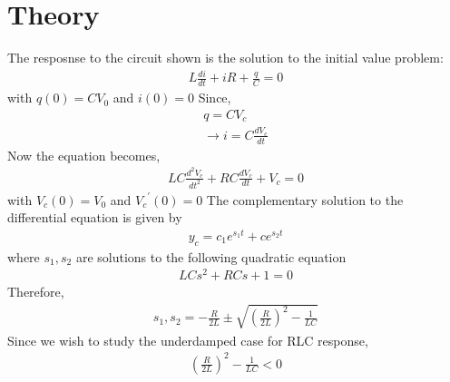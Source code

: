 \documentclass[a4paper,12pt]{article}
\begin{document}
\section{Theory}
\begin{figure}[!ht]
\centering
{}%
\label{fig:my_label}
\end{figure}
The resposnse to the circuit shown is the solution to the initial value problem:
\begin{align}
  L\frac{di}{dt} + iR + \frac{q}{C} = 0
\end{align}
with $q(0) = CV_0$ and $i(0) = 0$
\newline
\newline
Since,
\begin{align}
  q = CV_c\\
  \rightarrow i = C\frac{dV_c}{dt}
\end{align}
Now the equation becomes,
\begin{align}
  LC\frac{d^2V_c}{dt^2} + RC\frac{dV_c}{dt} + V_c = 0 
\end{align}
with $V_c(0) = V_0$ and ${V_c}^{\prime}(0) = 0$ 
\newline
The complementary solution to the differential equation is given by 
\begin{align}
  y_c = c_1e^{s_1t} + ce^{s_2t}
\end{align}
where $s_1, s_2$ are solutions to the following quadratic equation
\begin{align}
  LCs^2 + RCs + 1 = 0
\end{align}
Therefore,
\begin{align}
  s_1, s_2 = -\frac{R}{2L} \pm \sqrt{\left(\frac{R}{2L}\right)^2 - \frac{1}{LC}}
\end{align}
Since we wish to study the underdamped case for RLC response, 
\begin{align}
  \left( \frac{R}{2L} \right)^2  - \frac{1}{LC} < 0
\end{align}
\end{document}
